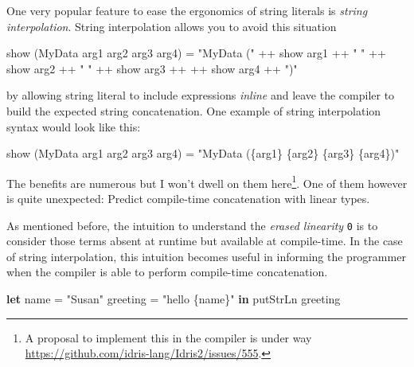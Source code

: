 \documentclass[
]{article}
\newenvironment{Shaded}{}{}
\newcommand{\DataTypeTok}[1]{\textcolor[rgb]{0.56,0.13,0.00}{#1}}
\newcommand{\FunctionTok}[1]{\textcolor[rgb]{0.02,0.16,0.49}{#1}}
\newcommand{\KeywordTok}[1]{\textcolor[rgb]{0.00,0.44,0.13}{\textbf{#1}}}
\newcommand{\NormalTok}[1]{#1}
\newcommand{\OperatorTok}[1]{\textcolor[rgb]{0.40,0.40,0.40}{#1}}
\newcommand{\OtherTok}[1]{\textcolor[rgb]{0.00,0.44,0.13}{#1}}
\newcommand{\StringTok}[1]{\textcolor[rgb]{0.25,0.44,0.63}{#1}}
\begin{document}
One very popular feature to ease the ergonomics of string literals is
\emph{string interpolation}. String interpolation allows you to avoid
this situation

\begin{Shaded}
\begin{Highlighting}[]
\FunctionTok{show}\NormalTok{ (}\DataTypeTok{MyData}\NormalTok{ arg1 arg2 arg3 arg4) }\OtherTok{=} 
    \StringTok{"MyData ("} \OperatorTok{++} \FunctionTok{show}\NormalTok{ arg1 }\OperatorTok{++} \StringTok{" "} \OperatorTok{++} \FunctionTok{show}\NormalTok{ arg2 }\OperatorTok{++} \StringTok{" "} \OperatorTok{++} \FunctionTok{show}\NormalTok{ arg3 }\OperatorTok{++} \OperatorTok{++} \FunctionTok{show}\NormalTok{ arg4 }\OperatorTok{++} \StringTok{")"}
\end{Highlighting}
\end{Shaded}

by allowing string literal to include expressions \emph{inline} and
leave the compiler to build the expected string concatenation. One
example of string interpolation syntax would look like this:

\begin{Shaded}
\begin{Highlighting}[]
\FunctionTok{show}\NormalTok{ (}\DataTypeTok{MyData}\NormalTok{ arg1 arg2 arg3 arg4) }\OtherTok{=} \StringTok{"MyData (\{arg1\} \{arg2\} \{arg3\} \{arg4\})"}
\end{Highlighting}
\end{Shaded}

The benefits are numerous but I won't dwell on them here\footnote{A
  proposal to implement this in the compiler is under way
  \url{https://github.com/idris-lang/Idris2/issues/555}.}. One of them
however is quite unexpected: Predict compile-time concatenation with
linear types.

As mentioned before, the intuition to understand the \emph{erased
linearity} \texttt{0} is to consider those terms absent at runtime but
available at compile-time. In the case of string interpolation, this
intuition becomes useful in informing the programmer when the compiler
is able to perform compile-time concatenation.

\begin{Shaded}
\begin{Highlighting}[]
\KeywordTok{let}\NormalTok{ name }\OtherTok{=} \StringTok{"Susan"}
\NormalTok{    greeting }\OtherTok{=} \StringTok{"hello \{name\}"} \KeywordTok{in}
    \FunctionTok{putStrLn}\NormalTok{ greeting}
\end{Highlighting}
\end{Shaded}
\end{document}
